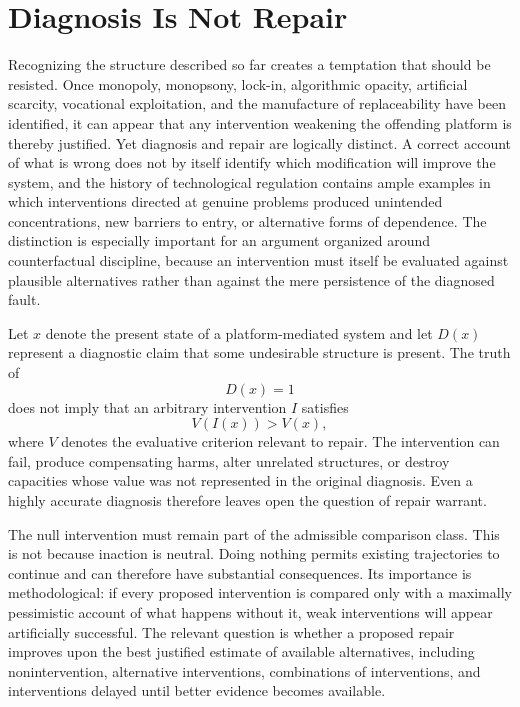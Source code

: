 \documentclass[11pt]{article}
\begin{document}
\section{Diagnosis Is Not Repair}

Recognizing the structure described so far creates a temptation that should be resisted. Once monopoly, monopsony, lock-in, algorithmic opacity, artificial scarcity, vocational exploitation, and the manufacture of replaceability have been identified, it can appear that any intervention weakening the offending platform is thereby justified. Yet diagnosis and repair are logically distinct. A correct account of what is wrong does not by itself identify which modification will improve the system, and the history of technological regulation contains ample examples in which interventions directed at genuine problems produced unintended concentrations, new barriers to entry, or alternative forms of dependence. The distinction is especially important for an argument organized around counterfactual discipline, because an intervention must itself be evaluated against plausible alternatives rather than against the mere persistence of the diagnosed fault.

Let \(x\) denote the present state of a platform-mediated system and let \(D(x)\) represent a diagnostic claim that some undesirable structure is present. The truth of
\[
D(x)=1
\]
does not imply that an arbitrary intervention \(I\) satisfies
\[
V(I(x))>V(x),
\]
where \(V\) denotes the evaluative criterion relevant to repair. The intervention can fail, produce compensating harms, alter unrelated structures, or destroy capacities whose value was not represented in the original diagnosis. Even a highly accurate diagnosis therefore leaves open the question of repair warrant.

The null intervention must remain part of the admissible comparison class. This is not because inaction is neutral. Doing nothing permits existing trajectories to continue and can therefore have substantial consequences. Its importance is methodological: if every proposed intervention is compared only with a maximally pessimistic account of what happens without it, weak interventions will appear artificially successful. The relevant question is whether a proposed repair improves upon the best justified estimate of available alternatives, including nonintervention, alternative interventions, combinations of interventions, and interventions delayed until better evidence becomes available.
\end{document}
